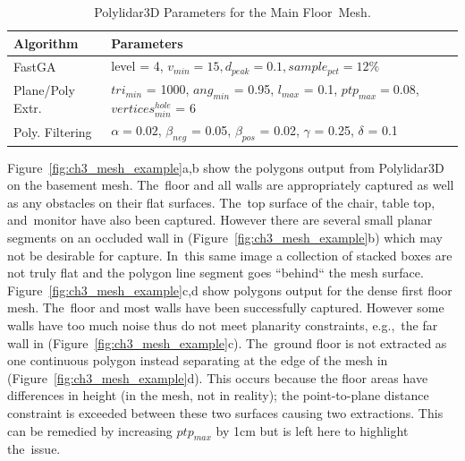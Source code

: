 \begin{table}[H]
\centering
\caption{Polylidar3D Parameters for the Main Floor~Mesh.}\label{table:ch3_mesh_parameters_b}
\begin{tabular}{@{}ll@{}}
\toprule
\textbf{Algorithm}        & \textbf{Parameters}                                                          \\ \midrule
FastGA           & level = 4,  $v_{min} = 15, d_{peak} = 0.1, sample_{pct} = 12\%$            \\
Plane/Poly Extr.      & $tri_{min}$ = 1000, $ang_{min}$ = 0.95, $l_{max}$ = 0.1, $ptp_{max} = 0.08$, $vertices^{hole}_{min}$ = 6     \\
Poly. Filtering      & $\alpha = 0.02$, $\beta_{neg}$ = 0.05, $\beta_{pos}$ = 0.02, $\gamma$ = 0.25, $\delta$ = 0.1    \\ \bottomrule
\end{tabular}
\end{table}

Figure~\ref{fig:ch3_mesh_example}a,b show the polygons output from Polylidar3D on the basement mesh.  The~floor and all walls are appropriately captured as well as any obstacles on their flat surfaces. The~top surface of the chair, table top, and~monitor have also been captured. However there are several small planar segments on an occluded wall in (Figure~\ref{fig:ch3_mesh_example}b) which may not be desirable for capture. In~this same image a collection of stacked boxes are not truly flat and the polygon line segment goes ``behind`` the mesh surface.  Figure~\ref{fig:ch3_mesh_example}c,d show  polygons output for the dense first floor mesh. The~floor and most walls have been successfully captured. However some walls have too much noise thus do not meet planarity constraints, e.g.,~the far wall in (Figure~\ref{fig:ch3_mesh_example}c). The~ground floor is not extracted as one continuous polygon instead separating at the edge of the mesh in (Figure~\ref{fig:ch3_mesh_example}d).  This occurs because the floor areas have differences in height (in the mesh, not in reality); the point-to-plane distance constraint is exceeded between these two surfaces causing two extractions. This can be remedied by increasing $ptp_{max}$ by 1cm but is left here to highlight the~issue.


